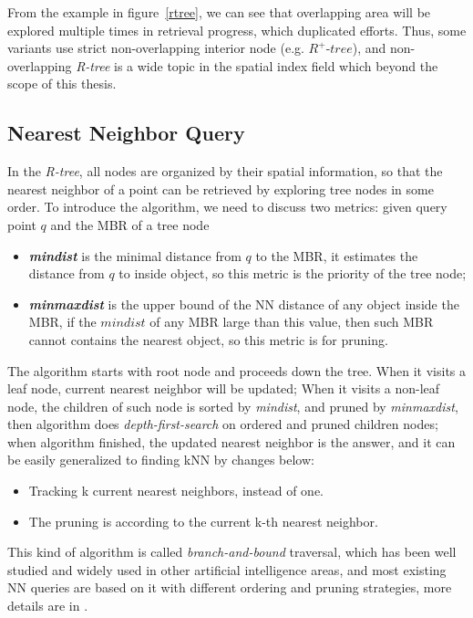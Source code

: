 From the example in figure~\ref{rtree}, we can see that overlapping area will be explored
multiple times in retrieval progress, which duplicated efforts.
Thus, some variants use strict non-overlapping interior node (e.g.
$R^+\textit{-tree}$\cite{sellis1987r+}), and non-overlapping \textit{R-tree} is a wide topic in
the spatial index field which beyond the scope of this thesis.

\subsection{Nearest Neighbor Query}
In the \textit{R-tree}, all nodes are organized by their spatial information,
so that the nearest neighbor of a point can be retrieved by exploring tree nodes in some order.
To introduce the algorithm, we need to discuss two metrics: given query point $q$ and the MBR of a tree node
\begin{itemize}
  \item \textit{\textbf{mindist}} is the minimal distance from $q$ to the MBR, it estimates the
    distance from $q$ to inside object, so this metric is the priority of the tree node;
  \item \textit{\textbf{minmaxdist}} is the upper bound of the NN distance of any object inside
    the MBR, if the $mindist$ of any MBR large than this value, then such MBR cannot contains
    the nearest object, so this metric is for pruning.
\end{itemize}
The algorithm starts with root node and proceeds down the tree. When it visits a leaf node,
current nearest neighbor will be updated;
When it visits a non-leaf node, the children of such node is sorted by \textit{mindist}, and pruned by
\textit{minmaxdist}, then algorithm does \textit{depth-first-search} on ordered and pruned children nodes;
when algorithm finished, the updated nearest neighbor is the answer, and it can be easily
generalized to finding kNN by changes below:
\begin{itemize}
  \item  Tracking k current nearest neighbors, instead of one.
  \item  The pruning is according to the current k-th nearest neighbor.
\end{itemize}

This kind of algorithm is called \textit{branch-and-bound} traversal, which has been well
studied and widely used in other artificial intelligence areas\cite{sellis1987r+},
and most existing NN queries are based on it with different ordering and pruning strategies,
more details are in \cite{roussopoulos1995nearest,cheung1998enhanced}.

